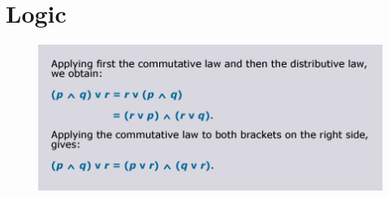 \documentclass{article}
\begin{document}
\section{Logic}
\begin{frame}
\begin{figure}
\centering
\includegraphics[width=0.7\linewidth]{./ex311}
\end{figure}
\end{frame}
\end{document}
